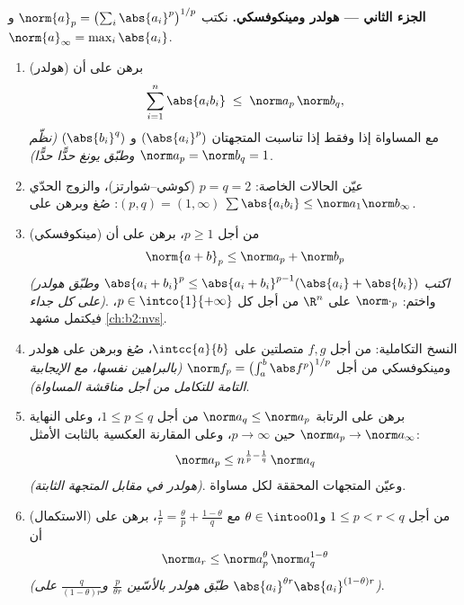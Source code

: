 \begin{problem}
\medskip
\noindent\textbf{الجزء الثاني --- هولدر ومينكوفسكي.} نكتب
$\norm{a}_p = \bigl(\sum_i \abs{a_i}^p\bigr)^{1/p}$ و
$\norm{a}_\infty = \max_i\abs{a_i}$.
\begin{enumerate}[resume]
  \item (هولدر) برهن على أن
        \[
        \sum_{i=1}^{n}\abs{a_ib_i} \;\leq\;
        \norm a_p\,\norm b_q ,
        \]
        مع المساواة إذا وفقط إذا تناسبت المتجهتان $(\abs{a_i}^p)$ و
        $(\abs{b_i}^q)$ \emph{(نظّم
        $\norm a_p = \norm b_q = 1$ وطبّق يونغ حدًّا حدًّا)}.
  \item عيّن الحالات الخاصة: $p = q = 2$
        (كوشي--شوارتز)، والزوج الحدّي $(p, q) = (1,
        \infty)$: صُغ وبرهن على $\sum\abs{a_ib_i} \leq
        \norm a_1\norm b_\infty$.
  \item (مينكوفسكي) من أجل $p \geq 1$، برهن على أن
        \[
        \norm{a + b}_p \leq \norm a_p + \norm b_p
        \]
        \emph{(اكتب $\abs{a_i + b_i}^p \leq \abs{a_i +
        b_i}^{p-1}(\abs{a_i} + \abs{b_i})$ وطبّق هولدر
        على كل جداء)}. واختم: $\norm\cdot_p$ 
        على $\R^n$ من أجل كل $p \in \intco{1}{+\infty}$،
        فيكتمل مشهد \cref{ch:b2:nvs}.
  \item النسخ التكاملية: من أجل $f, g$ متصلتين على
        $\intcc{a}{b}$، صُغ وبرهن على هولدر ومينكوفسكي
        من أجل $\norm f_p = \bigl(\int_a^b\abs
        f^p\bigr)^{1/p}$ \emph{(بالبراهين نفسها، مع الإيجابية
        التامة للتكامل من أجل مناقشة
        المساواة)}.
  \item برهن على الرتابة $\norm a_q \leq \norm a_p$ من أجل $1
        \leq p \leq q$، وعلى النهاية $\norm a_p \to
        \norm a_\infty$ حين $p \to \infty$، وعلى المقارنة
        العكسية بالثابت الأمثل:
        \[
        \norm a_p \leq n^{\frac1p - \frac1q}\,\norm a_q
        \]
        \emph{(هولدر في مقابل المتجهة الثابتة)}. وعيّن
        المتجهات المحققة لكل مساواة.
  \item (الاستكمال) من أجل $1 \leq p < r < q$ و$\theta \in
        \intoo01$ مع $\frac1r = \frac\theta p +
        \frac{1-\theta}q$، برهن على أن
        \[
        \norm a_r \leq \norm a_p^{\theta}\,
        \norm a_q^{1-\theta}
        \]
        \emph{(طبّق هولدر بالأسّين $\frac{p}{\theta
        r}$ و$\frac{q}{(1-\theta)r}$ على $\abs{a_i}^{\theta
        r}\abs{a_i}^{(1-\theta)r}$)}.
\end{enumerate}


\end{problem}
